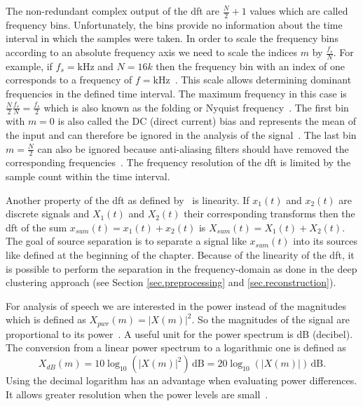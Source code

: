 The non-redundant complex output of the \gls{dft} are $\frac{N}{2}+1$ values which are called frequency bins.
Unfortunately, the bins provide no information about the time interval in which the samples were taken. In order to scale the frequency bins according to an absolute frequency axis we need to scale the indices $m$ by $\frac{f_s}{N}$. For example, if $f_s=\si{\kHz}$ and $N=16k$ then the frequency bin with an index of one corresponds to a frequency of $f=\si{\kHz}$~\cite[p.~67]{Lyons1997}.
This scale allows determining dominant frequencies in the defined time interval.
The maximum frequency in this case is $\frac{N}{2}\frac{f_s}{N}=\frac{f_s}{2}$ which is also known as the folding or Nyquist frequency~\cite[p.~28]{Lyons1997}.
The first bin with $m=0$ is also called the DC (direct current) bias and represents the mean of the input and can therefore be ignored in the analysis of the signal~\cite[p.~15]{Heinzel2002}. The last bin $m=\frac{N}{2}$ can also be ignored because anti-aliasing filters should have removed the corresponding frequencies~\cite[p.~16]{Heinzel2002}.
The frequency resolution of the \gls{dft} is limited by the sample count within the time interval.~\cite[p.~51]{Lyons1997}

Another property of the \gls{dft} as defined by~\textcite[p.~65]{Lyons1997} is linearity. If $x_1(t)$ and $x_2(t)$ are discrete signals and $X_1(t)$ and $X_2(t)$ their corresponding transforms then the \gls{dft} of the sum $x_{sum}(t)=x_1(t)+x_2(t)$ is $X_{sum}(t)=X_1(t)+X_2(t)$.
The goal of source separation is to separate a signal like $x_{sum}(t)$ into its sources like defined at the beginning of the chapter.
Because of the linearity of the \gls{dft}, it is possible to perform the separation in the frequency-domain as done in the deep clustering approach (see Section \ref{sec.preprocessing} and \ref{sec.reconstruction}).

For analysis of speech we are interested in the power instead of the magnitudes which is defined as $X_{pwr}(m)=|X(m)|^2$. So the magnitudes of the signal are proportional to its power~\cite[p.~9]{Lyons1997}. A useful unit for the power spectrum is dB (decibel). The conversion from a linear power spectrum to a logarithmic one is defined as
\begin{equation}
	X_{dB}(m)=10\log_{10}(|X(m)|^2)\,\si{\dB}=20\log_{10}(|X(m)|)\,\si{\dB}.
	\label{eq.decibel}
\end{equation}
Using the decimal logarithm has an advantage when evaluating power differences. It allows greater resolution when the power levels are small~\cite[p.~487]{Lyons1997}.

